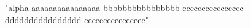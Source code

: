 \documentclass[article]{jss}
\begin{document}
\begin{CodeOutput}
[1] "alpha-aaaaaaaaaaaaaaaa-bbbbbbbbbbbbbbbb-cccccccccccccccc-dddddddddddddddd-eeeeeeeeeeeeeeee"
\end{CodeOutput}
\end{document}
